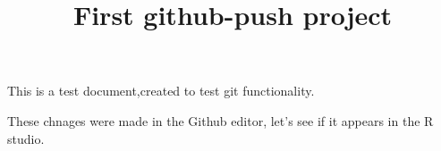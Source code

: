 \usepackage[T1]{fontenc}

\title{First github-push project}


This is a test document,created to test git functionality.

These chnages were made in the Github editor, let's see if it appears in the R studio.

